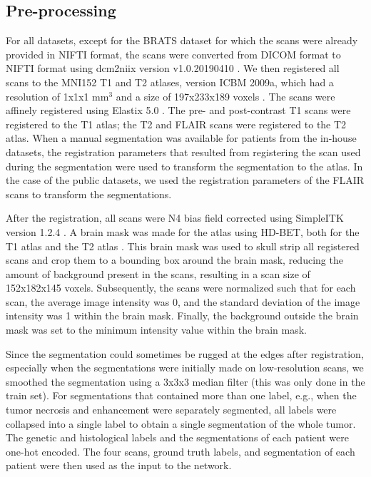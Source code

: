 \subsection{Pre-processing}
For all datasets, except for the \gls{BRATS} dataset for which the scans were already provided in \acrshort{NIFTI} format, the scans were converted from DICOM format to \acrshort{NIFTI} format using dcm2niix version v1.0.20190410 \autocite{li2016dcmniix}.
We then registered all scans to the MNI152 \gls{T1} and \gls{T2} atlases, version ICBM 2009a, which had a resolution of 1x1x1 mm$^3$ and a size of 197x233x189 voxels \autocite{fonov2011unbiased, fonov2009unbiased}.
The scans were affinely registered using Elastix 5.0 \autocite{klein2010elastix, shamonin2014fast}.
The pre- and post-contrast \gls{T1} scans were registered to the \gls{T1} atlas; the \gls{T2} and \gls{FLAIR} scans were registered to the \gls{T2} atlas.
When a manual segmentation was available for patients from the in-house datasets, the registration parameters that resulted from registering the scan used during the segmentation were used to transform the segmentation to the atlas.
In the case of the public datasets, we used the registration parameters of the \gls{FLAIR} scans to transform the segmentations.

After the registration, all scans were N4 bias field corrected using SimpleITK version 1.2.4 \autocite{lowekamp2013simpleitk}.
A brain mask was made for the atlas using HD-BET, both for the \gls{T1} atlas and the \gls{T2} atlas \autocite{isensee2019hdbet}.
This brain mask was used to skull strip all registered scans and crop them to a bounding box around the brain mask, reducing the amount of background present in the scans, resulting in a scan size of 152x182x145 voxels.
Subsequently, the scans were normalized such that for each scan, the average image intensity was 0, and the standard deviation of the image intensity was 1 within the brain mask.
Finally, the background outside the brain mask was set to the minimum intensity value within the brain mask.

Since the segmentation could sometimes be rugged at the edges after registration, especially when the segmentations were initially made on low-resolution scans, we smoothed the segmentation using a 3x3x3 median filter (this was only done in the train set).
For segmentations that contained more than one label, e.g., when the tumor necrosis and enhancement were separately segmented, all labels were collapsed into a single label to obtain a single segmentation of the whole tumor.
The genetic and histological labels and the segmentations of each patient were one-hot encoded.
The four scans, ground truth labels, and segmentation of each patient were then used as the input to the network.

